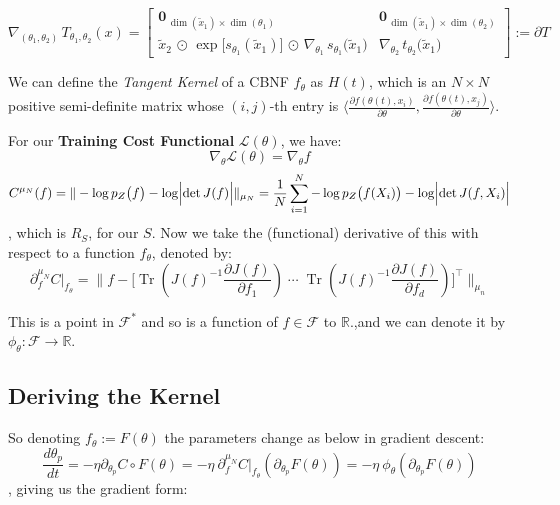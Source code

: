 \documentclass[11pt, a4paper]{article}
\theoremstyle{definition}
\theoremstyle{remark}
\newcommand{\R}{\mathbb{R}}
\newcommand{\empnorm}[1]{\|#1\|_{\mu_n}}
\newcommand{\inner}[2]{\langle #1 , #2 \rangle }
\newcommand{\tr}{\operatorname{Tr}}
\begin{document}
	\[
	\nabla_{(\theta_1,\theta_2)}\,T_{\theta_1,\theta_2}(x)
	=
	\begin{bmatrix}
		\mathbf{0}_{\,\dim(\tilde{x}_1)\times \dim(\theta_1)} 
		& 
		\mathbf{0}_{\,\dim(\tilde{x}_1)\times \dim(\theta_2)} 
		\\[6pt]
		\tilde{x}_2\,\odot\,\exp\bigl[s_{\theta_1}(\tilde{x}_1)\bigr]
		\,\odot\,
		\nabla_{\theta_1}\,s_{\theta_1}\bigl(\tilde{x}_1\bigr)
		&
		\nabla_{\theta_2}\,t_{\theta_2}\bigl(\tilde{x}_1\bigr)
	\end{bmatrix} := \partial T
	\]
	
	

	
	We can define the \textit{Tangent Kernel} of a CBNF \(f_\theta\) as \(H(t)\), which is an \(N\times N\) positive semi-definite matrix whose \((i,j)\)-th entry is \(\inner{\frac{\partial f(\theta(t),x_i)}{\partial \theta}}{\frac{\partial f(\theta(t),x_j)}{\partial \theta}}\).
	
	
	
	
	For our \textbf{Training Cost Functional} \(\mathcal{L}(\theta)\), we have:
	\[
	\nabla_\theta \mathcal{L}(\theta) = \nabla_\theta f
	\]
	\[
	C^{\mu_N}(f) = \| -\log p_Z\bigl(f \bigr) - \log \Bigl|\det J(f) \Bigr| \|_{\mu_N} =\frac{1}{N} \sum_{i=1}^{N}  -\log p_Z\bigl(f(X_i)\bigr) - \log \Bigl|\det J(f,X_i)\Bigr|
	\]
	, which is \(\hat{R}_S\), for our \(S\).
	Now we take the (functional) derivative of this with respect to a function \(f_\theta\), denoted by:
	\[
	\partial^{\mu_N}_{f} C\bigr|_{f_\theta} = \empnorm{ 
		f - \bigl[ \tr\left( J(f)^{-1} \frac{\partial J(f)}{\partial f_1} \right) \; \cdots \; \tr\left( J(f)^{-1} \frac{\partial J(f)}{\partial f_d} \right) \bigr]^\top
	}  
	\]
	
		This is a point in \(\mathcal{F}^*\) and so is a function of \(f \in \mathcal{F}\) to \(\R\).,and we can denote it by \(\phi_\theta:\mathcal{F}\to \R\).
	
	\subsection{Deriving the Kernel}
	So denoting \(f_\theta := F(\theta)\) the parameters change as below in gradient descent:
	\[
	\frac{d \theta_p}{dt} =  - \eta \partial_{\theta_p} C\circ F(\theta) = -\eta \ \partial^{\mu_N}_{f}C\bigr|_{f_\theta} (\partial_{\theta_p} F(\theta))  = 
- \eta \ \phi_\theta (\partial_{\theta_p} F(\theta))
	\]
, giving us the gradient form:
\end{document}
